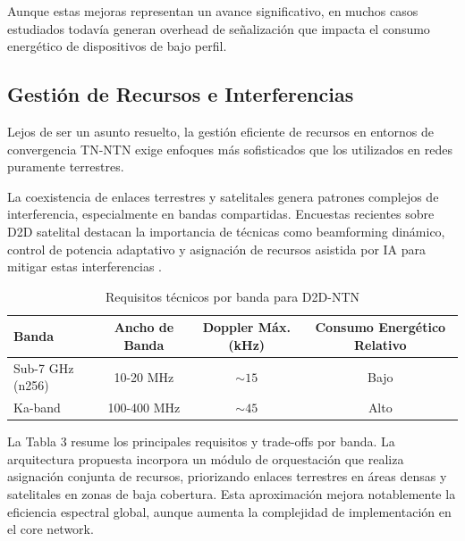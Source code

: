 Aunque estas mejoras representan un avance significativo, en muchos casos estudiados todavía generan overhead de señalización que impacta el consumo energético de dispositivos de bajo perfil.

\subsection{Gestión de Recursos e Interferencias}

Lejos de ser un asunto resuelto, la gestión eficiente de recursos en entornos de convergencia TN-NTN exige enfoques más sofisticados que los utilizados en redes puramente terrestres. 

La coexistencia de enlaces terrestres y satelitales genera patrones complejos de interferencia, especialmente en bandas compartidas. Encuestas recientes sobre D2D satelital destacan la importancia de técnicas como beamforming dinámico, control de potencia adaptativo y asignación de recursos asistida por IA para mitigar estas interferencias \cite{Pasandi2024_D2DSurvey}.

\begin{table}[t]
\centering
\caption{Requisitos técnicos por banda para D2D-NTN}
\label{tab:band_requirements}
\begin{tabular}{lccc}
\hline
Banda & Ancho de Banda & Doppler Máx. (kHz) & Consumo Energético Relativo \\
\hline
Sub-7 GHz (n256) & 10-20 MHz & $\sim 15$ & Bajo \\
Ka-band & 100-400 MHz & $\sim 45$ & Alto \\
\hline
\end{tabular}
\end{table}

La Tabla 3 resume los principales requisitos y trade-offs por banda. La arquitectura propuesta incorpora un módulo de orquestación que realiza asignación conjunta de recursos, priorizando enlaces terrestres en áreas densas y satelitales en zonas de baja cobertura. Esta aproximación mejora notablemente la eficiencia espectral global, aunque aumenta la complejidad de implementación en el core network.